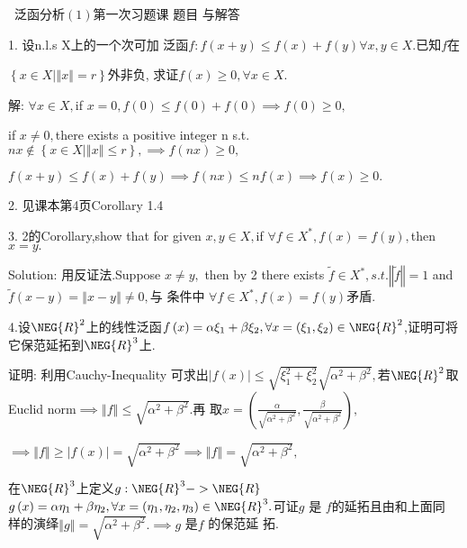 \documentclass{article}
\begin{document}
\begin{CJK}{GBK}{song}


\bigskip\ 
泛函分析$\left(
1\right) $第一次习题课 题目%
与解答

1. 设n.l.s X上的一个次可加%
泛函$f:f(x+y)\leq f\left( x\right) +f\left( y\right) \forall
x,y\in X.$已知$f$在

$\left\{ x\in X|\left\Vert x\right\Vert =r\right\} $外非负,%
求证$f\left( x\right) \geq 0,\forall x\in X.$

解: $\forall x\in X,$if $x=0,f\left( 0\right) \leq f\left( 0\right)
+f\left( 0\right) \implies f\left( 0\right) \geq 0,$

if $x\neq 0,$there exists a positive integer n s.t. $nx\notin \left\{ x\in
X|\left\Vert x\right\Vert \leq r\right\} ,\implies f\left( nx\right) \geq 0,$

$f(x+y)\leq f\left( x\right) +f\left( y\right) \implies f\left( nx\right)
\leq nf\left( x\right) \implies f\left( x\right) \geq 0.$

2. 见课本第4页Corollary 1.4

3. 2的Corollary,show that for given $x,y\in X,$if $\forall f\in
X^{\ast },f\left( x\right) =f\left( y\right) ,$then $x=y.$

Solution: 用反证法.Suppose $x\neq y,$ then by 2
there exists $\tilde{f}\in X^{\ast },s.t.\left\Vert \tilde{f}\right\Vert =1$
and $\tilde{f}\left( x-y\right) =\left\Vert x-y\right\Vert \neq 0,$与%
条件中 $\forall f\in X^{\ast },f\left( x\right) =f\left(
y\right) $矛盾.

4.设$\NEG{R}^{2}$上的线性泛函$%
f\left( x\right) =\alpha \xi _{1}+\beta \xi _{2},\forall x=\left( \xi
_{1},\xi _{2}\right) \in \NEG{R}^{2}$,证明可将%
它保范延拓到$\NEG{R}^{3}$上.

证明: 利用Cauchy-Inequality 可求出$%
\left\vert f\left( x\right) \right\vert \leq \sqrt{\xi _{1}^{2}+\xi _{2}^{2}}%
\sqrt{\alpha ^{2}+\beta ^{2}},$若$\NEG{R}^{2}$取Euclid norm$%
\implies \left\Vert f\right\Vert \leq \sqrt{\alpha ^{2}+\beta ^{2}}.$再%
取$x=\left( \frac{\alpha }{\sqrt{\alpha ^{2}+\beta ^{2}}},\frac{\beta 
}{\sqrt{\alpha ^{2}+\beta ^{2}}}\right) ,$

$\implies \left\Vert f\right\Vert \geq \left\vert f\left( x\right)
\right\vert =\sqrt{\alpha ^{2}+\beta ^{2}}\implies \left\Vert f\right\Vert =%
\sqrt{\alpha ^{2}+\beta ^{2}},$

在$\NEG{R}^{3}$上定义$g:\NEG{R}^{3}->\NEG{R}$ $%
g\left( x\right) =\alpha \eta _{1}+\beta \eta _{2},\forall x=\left( \eta
_{1},\eta _{2},\eta _{3}\right) \in \NEG{R}^{3}.$可证$g$ 是%
$f$的延拓且由和上面同%
样的演绎$\left\Vert g\right\Vert =\sqrt{\alpha
^{2}+\beta ^{2}}.\implies g$ 是$f$ 的保范延%
拓.


\end{CJK}
\end{document}
